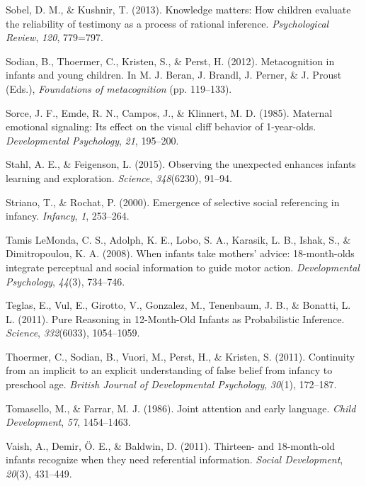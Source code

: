 \documentclass[english,man]{apa6}
\theoremstyle{definition}
\theoremstyle{definition}
\theoremstyle{definition}
\theoremstyle{remark}
\begin{document}
\hypertarget{ref-Sobel2013}{}
Sobel, D. M., \& Kushnir, T. (2013). Knowledge matters: How children
evaluate the reliability of testimony as a process of rational
inference. \emph{Psychological Review}, \emph{120}, 779=797.

\hypertarget{ref-Sodian2012}{}
Sodian, B., Thoermer, C., Kristen, S., \& Perst, H. (2012).
Metacognition in infants and young children. In M. J. Beran, J. Brandl,
J. Perner, \& J. Proust (Eds.), \emph{Foundations of metacognition} (pp.
119--133).

\hypertarget{ref-Sorce1985}{}
Sorce, J. F., Emde, R. N., Campos, J., \& Klinnert, M. D. (1985).
Maternal emotional signaling: Its effect on the visual cliff behavior of
1-year-olds. \emph{Developmental Psychology}, \emph{21}, 195--200.

\hypertarget{ref-Stahl2015}{}
Stahl, A. E., \& Feigenson, L. (2015). Observing the unexpected enhances
infants learning and exploration. \emph{Science}, \emph{348}(6230),
91--94.

\hypertarget{ref-Striano2000}{}
Striano, T., \& Rochat, P. (2000). Emergence of selective social
referencing in infancy. \emph{Infancy}, \emph{1}, 253--264.

\hypertarget{ref-TamisLeMonda2008}{}
Tamis LeMonda, C. S., Adolph, K. E., Lobo, S. A., Karasik, L. B., Ishak,
S., \& Dimitropoulou, K. A. (2008). When infants take mothers' advice:
18-month-olds integrate perceptual and social information to guide motor
action. \emph{Developmental Psychology}, \emph{44}(3), 734--746.

\hypertarget{ref-Teglas2011}{}
Teglas, E., Vul, E., Girotto, V., Gonzalez, M., Tenenbaum, J. B., \&
Bonatti, L. L. (2011). Pure Reasoning in 12-Month-Old Infants as
Probabilistic Inference. \emph{Science}, \emph{332}(6033), 1054--1059.

\hypertarget{ref-Thoermer2011}{}
Thoermer, C., Sodian, B., Vuori, M., Perst, H., \& Kristen, S. (2011).
Continuity from an implicit to an explicit understanding of false belief
from infancy to preschool age. \emph{British Journal of Developmental
Psychology}, \emph{30}(1), 172--187.

\hypertarget{ref-Tomasello1986}{}
Tomasello, M., \& Farrar, M. J. (1986). Joint attention and early
language. \emph{Child Development}, \emph{57}, 1454--1463.

\hypertarget{ref-Vaish2011}{}
Vaish, A., Demir, Ö. E., \& Baldwin, D. (2011). Thirteen- and
18-month-old infants recognize when they need referential information.
\emph{Social Development}, \emph{20}(3), 431--449.
\end{document}
